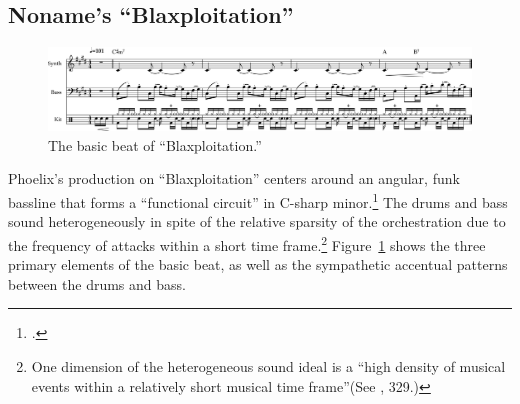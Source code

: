 \subsection*{\centering Noname's ``Blaxploitation''}

\begin{figure}[h]
    \centering
    \includegraphics[width=\textwidth]{images/figures/chp 02/Figure-02.5-Blaxploitation-BB.pdf}
    \caption{The basic beat of ``Blaxploitation.''}
    \label{fig:4.1}
\end{figure}

Phoelix's production on ``Blaxploitation'' centers around an angular, funk bassline that forms a ``functional circuit'' in C-sharp minor.\footnote{\cite{kyleadamsHarmonicSyntacticMotivic2020}.} The drums and bass sound heterogeneously in spite of the relative sparsity of the orchestration due to the frequency of attacks within a short time frame.\footnote{One dimension of the heterogeneous sound ideal is a ``high density of musical events within a relatively short musical time frame''(See \cite{ollywilsonHeterogeneousSoundIdeal1992}, 329.)} Figure~\ref{fig:4.1} shows the three primary elements of the basic beat, as well as the sympathetic accentual patterns between the drums and bass.

